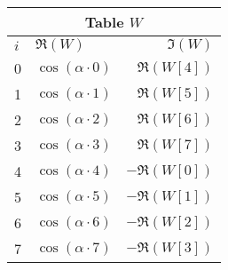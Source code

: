 \begin{tabular}{|l|l|r|}
	\multicolumn{3}{c}{Table $W$} \\ \hline
	$i$ & $\Re(W)$ & $\Im(W)$ \\ \hline
	0 & $\cos(\alpha \cdot 0)$ & $\Re(W[4])$ \\
	1 & $\cos(\alpha \cdot 1)$ & $\Re(W[5])$ \\
	2 & $\cos(\alpha \cdot 2)$ & $\Re(W[6])$ \\
	3 & $\cos(\alpha \cdot 3)$ & $\Re(W[7])$ \\	
	4 & $\cos(\alpha \cdot 4)$ & $-\Re(W[0])$ \\
	5 & $\cos(\alpha \cdot 5)$ & $-\Re(W[1])$ \\
	6 & $\cos(\alpha \cdot 6)$ & $-\Re(W[2])$ \\
	7 & $\cos(\alpha \cdot 7)$ & $-\Re(W[3])$ \\ \hline
\end{tabular}